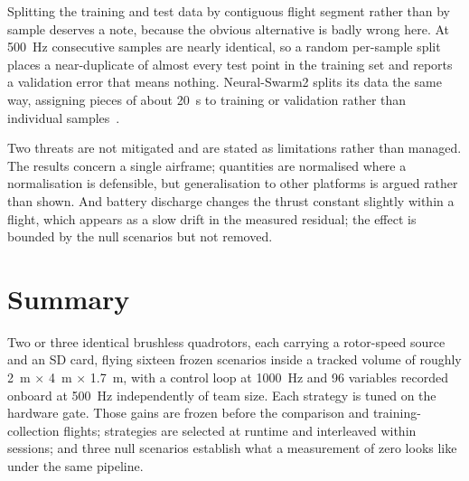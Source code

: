 Splitting the training and test data by contiguous flight segment rather than by sample deserves a
note, because the obvious alternative is badly wrong here. At \SI{500}{\hertz} consecutive samples
are nearly identical, so a random per-sample split places a near-duplicate of almost every test
point in the training set and reports a validation error that means nothing. Neural-Swarm2 splits
its data the same way, assigning pieces of about \SI{20}{\second} to training or validation rather
than individual samples~\cite{shi2022neuralswarm2}.

Two threats are not mitigated and are stated as limitations rather than managed. The results
concern a single airframe; quantities are normalised where a normalisation is defensible, but
generalisation to other platforms is argued rather than shown. And battery discharge changes the
thrust constant slightly within a flight, which appears as a slow drift in the measured residual;
the effect is bounded by the null scenarios but not removed.

\section{Summary}
\label{sec:setup-summary}

Two or three identical brushless quadrotors, each carrying a rotor-speed source and an SD card,
flying sixteen frozen scenarios inside a tracked volume of roughly \SI{2}{\metre} $\times$
\SI{4}{\metre} $\times$ \SI{1.7}{\metre}, with a control loop at \SI{1000}{\hertz} and \num{96}
variables recorded onboard at \SI{500}{\hertz} independently of team size. Each strategy is tuned
on the hardware gate. Those
gains are frozen before the comparison and training-collection flights; strategies are selected at
runtime and interleaved within sessions; and three null scenarios
establish what a measurement of zero looks like under the same pipeline.


